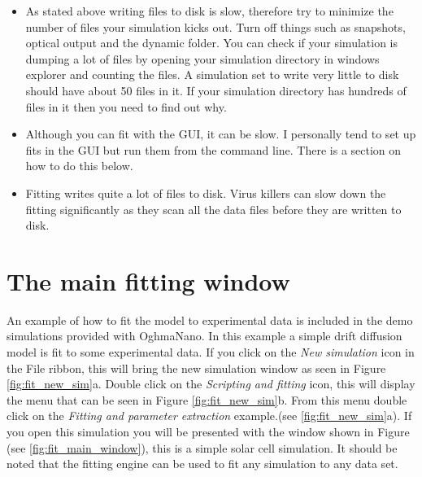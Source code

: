 \begin{itemize}
  \item As stated above writing files to disk is slow, therefore try to minimize the number of files your simulation kicks out. Turn off things such as snapshots, optical output and the dynamic folder.  You can check if your simulation is dumping a lot of files by opening your simulation directory in windows explorer and counting the files.  A simulation set to write very little to disk should have about 50 files in it. If your simulation directory has hundreds of files in it then you need to find out why.

 \item Although you can fit with the GUI, it can be slow. I personally tend to set up fits in the GUI but run them from the command line. There is a section on how to do this below.

 \item Fitting writes quite a lot of files to disk. Virus killers can slow down the fitting significantly as they scan all the data files before they are written to disk.   
\end{itemize}

\section{The main fitting window}

An example of how to fit the model to experimental data is included in the demo simulations provided with OghmaNano. In this example a simple drift diffusion model is fit to some experimental data. If you click on the \emph{New simulation} icon in the File ribbon, this will bring the new simulation window as seen in Figure \ref{fig:fit_new_sim}a. Double click on the \emph{Scripting and fitting} icon, this will display the menu that can be seen in Figure \ref{fig:fit_new_sim}b. From this menu double click on the  \emph{Fitting and parameter extraction} example.(see \ref{fig:fit_new_sim}a). If you open this simulation you will be presented with the window shown in Figure (see \ref{fig:fit_main_window}), this is a simple solar cell simulation. It should be noted that the fitting engine can be used to fit any simulation to any data set.


